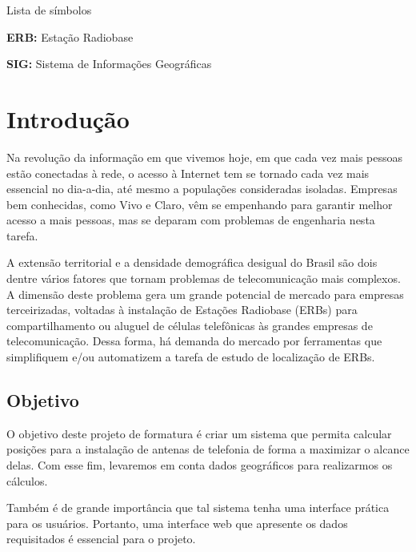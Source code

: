 \documentclass[]{politex}
\begin{document}
\listadefiguras
\listadetabelas

\begin{pretextualsection}{Lista de símbolos}

\textbf{ERB:} Estação Radiobase

\textbf{SIG:} Sistema de Informações Geográficas

\end{pretextualsection}

\sumario




\chapter{Introdução}
Na revolução da informação em que vivemos hoje, em que cada vez mais pessoas
estão conectadas à rede, o acesso à Internet tem se tornado cada vez mais
essencial no dia-a-dia, até mesmo a populações consideradas isoladas. Empresas
bem conhecidas, como Vivo e Claro, vêm se empenhando para garantir melhor
acesso a mais pessoas, mas se deparam com problemas de engenharia nesta
tarefa.

A extensão territorial e a densidade demográfica desigual do Brasil são dois
dentre vários fatores que tornam problemas de telecomunicação mais complexos.
A dimensão deste problema gera um grande potencial de mercado para empresas
terceirizadas, voltadas à instalação de Estações Radiobase (ERBs) para
compartilhamento ou aluguel de células telefônicas às grandes empresas de
telecomunicação. Dessa forma, há demanda do mercado por ferramentas que
simplifiquem e/ou automatizem a tarefa de estudo de localização de ERBs.

\section{Objetivo}
O objetivo deste projeto de formatura é criar um sistema que permita calcular
posições para a instalação de antenas de telefonia de forma a maximizar o
alcance delas. Com esse fim, levaremos em conta dados geográficos para
realizarmos os cálculos.

Também é de grande importância que tal sistema tenha uma interface prática
para os usuários. Portanto, uma interface web que apresente os dados
requisitados é essencial para o projeto.
\end{document}
